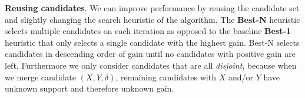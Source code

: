 \documentclass{llncs}
\begin{document}


\smallskip \noindent \textbf{Reusing candidates}.  We can improve performance by reusing the candidate set and slightly changing the search heuristic of the algorithm. The \textbf{Best-N} heuristic selects multiple candidates on each iteration as opposed to the baseline \textbf{Best-1} heuristic that only selects a single candidate with the highest gain. Best-N selects candidates in descending order of gain until no candidates with positive gain are left. Furthermore we only consider candidates that are all \emph{disjoint}, because when we merge candidate $(X,Y,\delta)$, remaining candidates with $X$ and/or $Y$ have unknown support and therefore unknown gain.%




\end{document}

